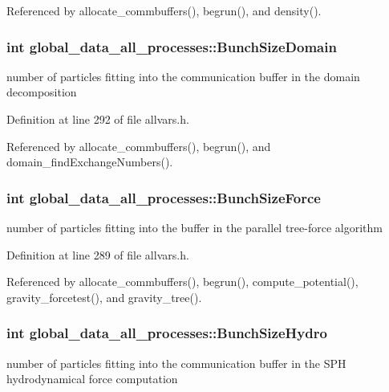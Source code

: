 Referenced by allocate\_\-commbuffers(), begrun(), and density().

\hypertarget{structglobal__data__all__processes_abf3206e6032910640e91585c25bd85b2}{
\subsubsection[{BunchSizeDomain}]{\setlength{\rightskip}{0pt plus 5cm}int {\bf global\_\-data\_\-all\_\-processes::BunchSizeDomain}}}
\label{structglobal__data__all__processes_abf3206e6032910640e91585c25bd85b2}
number of particles fitting into the communication buffer in the domain decomposition 

Definition at line 292 of file allvars.h.



Referenced by allocate\_\-commbuffers(), begrun(), and domain\_\-findExchangeNumbers().

\hypertarget{structglobal__data__all__processes_a2f6d4697219a2ec2e3db7f09ab31bcea}{
\subsubsection[{BunchSizeForce}]{\setlength{\rightskip}{0pt plus 5cm}int {\bf global\_\-data\_\-all\_\-processes::BunchSizeForce}}}
\label{structglobal__data__all__processes_a2f6d4697219a2ec2e3db7f09ab31bcea}
number of particles fitting into the buffer in the parallel tree-\/force algorithm 

Definition at line 289 of file allvars.h.



Referenced by allocate\_\-commbuffers(), begrun(), compute\_\-potential(), gravity\_\-forcetest(), and gravity\_\-tree().

\hypertarget{structglobal__data__all__processes_afe2775a289a902710358d98ba607a0aa}{
\subsubsection[{BunchSizeHydro}]{\setlength{\rightskip}{0pt plus 5cm}int {\bf global\_\-data\_\-all\_\-processes::BunchSizeHydro}}}
\label{structglobal__data__all__processes_afe2775a289a902710358d98ba607a0aa}
number of particles fitting into the communication buffer in the SPH hydrodynamical force computation 

